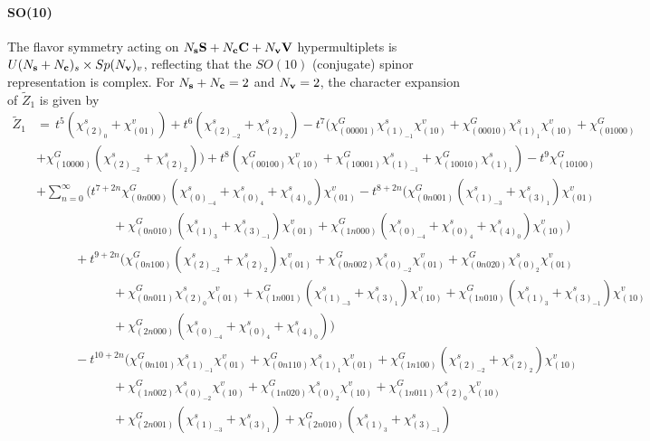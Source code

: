 \documentclass[letterpaper, 11pt]{article}
\newcommand{\nn}{\nonumber}
\begin{document}
{\paragraph{SO(10)} The flavor symmetry acting on $N_{\bf s} \mathbf{S} + N_{\bf c} \mathbf{C} + N_{\bf v} \mathbf{V}$ hypermultiplets is $U(N_{\bf s} + N_{\bf c})_s \times Sp(N_{\bf v})_v$, reflecting  that the $SO(10)$ (conjugate) spinor representation is complex. For $N_{\bf s} + N_{\bf c} = 2$ and $N_{\bf v} = 2$, the character expansion of $\tilde{Z}_1$ is given by 
\begin{align}
  \label{eq:so10-2s2v}
\tilde{Z}_1&=\,t^5(\chi^s_{(2)_0}+\chi^v_{(01)})+t^6(\chi^s_{(2)_{-2}}+\chi^s_{(2)_2})-t^7(\chi^G_{(00001)}\chi^s_{(1)_{-1}}\chi^v_{(10)}+\chi^G_{(00010)}\chi^s_{(1)_1}\chi^v_{(10)}+\chi^G_{(01000)}\nn\\
&+\chi^G_{(10000)}(\chi^s_{(2)_{-2}}+\chi^s_{(2)_2}))+t^8(\chi^G_{(00100)}\chi^v_{(10)}+\chi^G_{(10001)}\chi^s_{(1)_{-1}}+\chi^G_{(10010)}\chi^s_{(1)_1})-t^9\chi^G_{(10100)}\nn\\
&\textstyle+\sum_{n=0}^{\infty}\Big(t^{7+2n}\chi^G_{(0n000)}(\chi^s_{(0)_{-4}}+\chi^s_{(0)_4}+\chi^s_{(4)_0})\chi^v_{(01)} -t^{8+2n}(\chi^G_{(0n001)}(\chi^s_{(1)_{-3}}+\chi^s_{(3)_1})\chi^v_{(01)} \nn\\&\qquad\quad\qquad\quad
+\chi^G_{(0n010)}(\chi^s_{(1)_3}+\chi^s_{(3)_{-1}})\chi^v_{(01)} +\chi^G_{(1n000)}(\chi^s_{(0)_{-4}}+\chi^s_{(0)_4}+\chi^s_{(4)_0})\chi^v_{(10)})\nn\\
&\qquad\quad+t^{9+2n}(\chi^G_{(0n100)}(\chi^s_{(2)_{-2}}+\chi^s_{(2)_2})\chi^v_{(01)}+\chi^G_{(0n002)}\chi^s_{(0)_{-2}}\chi^v_{(01)}+\chi^G_{(0n020)}\chi^s_{(0)_2}\chi^v_{(01)}\nn\\
&\qquad\qquad\qquad+\chi^G_{(0n011)}\chi^s_{(2)_0}\chi^v_{(01)}+\chi^G_{(1n001)}(\chi^s_{(1)_{-3}}+\chi^s_{(3)_1})\chi^v_{(10)}+\chi^G_{(1n010)}(\chi^s_{(1)_3}+\chi^s_{(3)_{-1}})\chi^v_{(10)}\nn\\
&\qquad\qquad\qquad+\chi^G_{(2n000)}(\chi^s_{(0)_{-4}}+\chi^s_{(0)_4}+\chi^s_{(4)_0}))\nn\\
&\qquad\quad-t^{10+2n}(\chi^G_{(0n101)}\chi^s_{(1)_{-1}}\chi^v_{(01)}+\chi^G_{(0n110)}\chi^s_{(1)_1}\chi^v_{(01)}+\chi^G_{(1n100)}(\chi^s_{(2)_{-2}}+\chi^s_{(2)_2})\chi^v_{(10)}\nn\\
&\qquad\qquad\qquad+\chi^G_{(1n002)}\chi^s_{(0)_{-2}}\chi^v_{(10)}+\chi^G_{(1n020)}\chi^s_{(0)_2}\chi^v_{(10)}+\chi^G_{(1n011)}\chi^s_{(2)_0}\chi^v_{(10)}\nn\\
&\qquad\qquad\qquad+\chi^G_{(2n001)}(\chi^s_{(1)_{-3}}+\chi^s_{(3)_1})+\chi^G_{(2n010)}(\chi^s_{(1)_3}+\chi^s_{(3)_{-1}})\nn\\

\end{align}}
\end{document}
